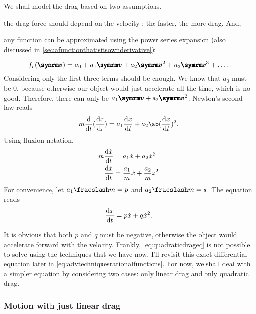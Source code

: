 We shall model the drag based on two assumptions. \begin{enumerate*}[label = \roman*.)]
    \item the drag force should depend on the velocity : the faster, the more drag. And,
    \item any function can be approximated using the power series expansion (also discussed in \cref{sec:afunctionthatisitsownderivative}):
\end{enumerate*}
\begin{equation*}
    f_r(\vv{v}) = a_0 + a_1\vv{v} + a_2\vv{v}^2 + a_3\vv{v}^3 + \dots.
\end{equation*}
Considering only the first three terms should be enough. We know that $a_0$ must be $0$, because otherwise our object would just accelerate all the time, which is no good. Therefore, there can only be $a_1\vv{v} + a_2\vv{v}^2$. Newton's second law reads
\begin{equation*}
	m\odv*{(\odv{x}{t})}{t} = a_1\odv{x}{t} + a_2\ab(\odv{x}{t})^2.
\end{equation*}
Using fluxion notation,
\begin{align*}
    m\odv{\dot{x}}{t} &= a_1\dot{x} + a_2\dot{x}^2 \\
    \odv{\dot{x}}{t} &= \frac{a_1}{m}\dot{x} + \frac{a_2}{m}\dot{x}^2
\end{align*}
For convenience, let $\flatfrac{a_1}{m} = p$ and $\flatfrac{a_2}{m} = q$. The equation reads
\begin{equation}
    \odv{\dot{x}}{t} = p\dot{x} + q\dot{x}^2. \label{eq:quadraticdrageq}
\end{equation}

It is obvious that both $p$ and $q$ must be negative, otherwise the object would accelerate forward with the velocity. Frankly, \cref{eq:quadraticdrageq} is not possible to solve using the techniques that we have now. I'll revisit this exact differential equation later in \cref{eq:advtechniquesrationalfunctions}. For now, we shall deal with a simpler equation by considering two cases: only linear drag and only quadratic drag.

\subsubsection{Motion with just linear drag}

